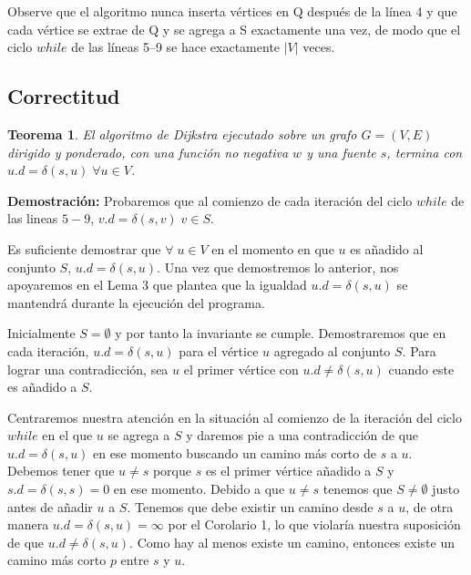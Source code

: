 \documentclass[12pt]{article}
\newcommand{\proof}{\textbf{Demostración:} }
\newcommand{\nl}{\vspace{0.3cm}}
\newtheorem{theorem}{Teorema}
\begin{document}
\nl

Observe que el algoritmo nunca inserta vértices en Q después de la línea 4 y que cada vértice se extrae de Q y se agrega a S exactamente una vez, de modo que el ciclo $while$ de las líneas 5–9 se hace exactamente $|V|$ veces.

\subsection{Correctitud}

\begin{theorem}
	El algoritmo de Dijkstra ejecutado sobre un grafo $G = (V,E) $ dirigido y ponderado, con una función no negativa $w$ y una fuente $s$, termina con $u.d = \delta(s, u) \; \forall u \in V$.
\end{theorem}

\proof Probaremos que al comienzo de cada iteración del ciclo $while$ de las lineas $5-9$, $v.d = \delta(s, v) \; v \in S$.

\nl

Es suficiente demostrar que $\forall \; u \in V$ en el momento en que $u$ es añadido al conjunto $S$, $u.d = \delta(s, u)$. Una vez que demostremos lo anterior, nos apoyaremos en el Lema 3 que plantea que la igualdad $u.d = \delta(s, u)$ se mantendrá durante la ejecución del programa.

\nl

Inicialmente $S = \emptyset$ y por tanto la invariante se cumple. Demostraremos que en cada iteración, $u.d = \delta(s,u)$ para el vértice $u$ agregado al conjunto $S$. Para lograr una contradicción, sea $u$ el primer vértice con $u.d \neq \delta(s,u)$ cuando este es añadido a $S$.

\newpage

Centraremos nuestra atención en la situación al comienzo de la iteración del ciclo $while$ en el que $u$ se agrega a $S$ y daremos pie a una contradicción de que $u.d = \delta(s, u)$ en ese momento buscando un camino más corto de $s$ a $u$. Debemos tener que $u \neq s$ porque $s$ es el primer vértice añadido a $S$ y $s.d = \delta(s, s) = 0$ en ese momento. Debido a que $u \neq s$ tenemos que $S \neq \emptyset$ justo antes de añadir $u$ a $S$. Tenemos que debe existir un camino desde $s$ a $u$, de otra manera $u.d = \delta(s, u) = \infty$ por el Corolario 1, lo que violaría nuestra suposición de que $u.d \neq \delta(s, u)$. Como hay al menos existe un camino, entonces existe un camino más corto $p$ entre $s$ y $u$.

\nl
\end{document}

